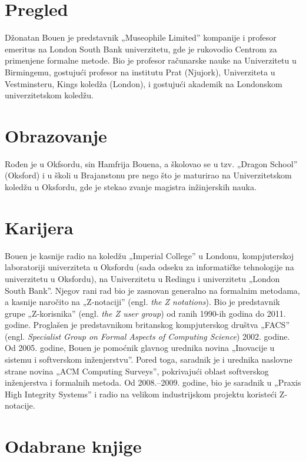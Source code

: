 \documentclass[a4paper]{article}
\begin{document}
\newpage
\section{Pregled}
\label{sec:pregled}
Džonatan Bouen je predstavnik „Museophile Limited” kompanije i profesor emeritus na London South Bank univerzitetu, gde je rukovodio Centrom za primenjene formalne metode. Bio je profesor računarske nauke na Univerzitetu u Birmingemu, gostujući profesor na institutu Prat (Njujork), Univerziteta u Vestminsteru, Kings koledža (London), i gostujući akademik na Londonskom univerzitetskom koledžu.

\section{Obrazovanje}
Rođen je u Okfsordu, sin Hamfrija Bouena, a školovao se u tzv. „Dragon School” (Oksford) i u školi u Brajanstonu pre nego što je maturirao na Univerzitetskom koledžu u Oksfordu, gde je stekao zvanje magistra inžinjerskih nauka. 
\section{Karijera}
Bouen je kasnije radio na koledžu „Imperial College” u Londonu, kompjuterskoj laboratoriji univerziteta u Oksfordu (sada odseku za informatičke tehnologije na univerzitetu u Oksfordu), na Univerzitetu u Redingu i univerzitetu „London South Bank”. Njegov rani rad bio je zasnovan generalno na formalnim metodama, a kasnije naročito na „Z-notaciji” (engl. \textit{the Z notations}). Bio je predstavnik grupe „Z-korisnika” (engl. \textit{the Z user group}) od ranih 1990-ih godina do 2011. godine. Proglašen je predstavnikom britanskog kompjuterskog društva „FACS” (engl. \textit{Specialist Group on Formal Aspects of Computing Science}) 2002. godine. Od 2005. godine, Bouen je pomoćnik glavnog urednika novina „Inovacije u sistemu i softverskom inženjerstvu”. Pored toga, saradnik je i urednika naslovne strane novina „ACM Computing Surveys”, pokrivajući oblast softverskog inženjerstva i formalnih metoda. Od 2008.–2009. godine, bio je saradnik u „Praxis High Integrity Systems” i radio na velikom industrijskom projektu koristeći Z-notacije. 
\section{Odabrane knjige}
\itemize
\end{document}
